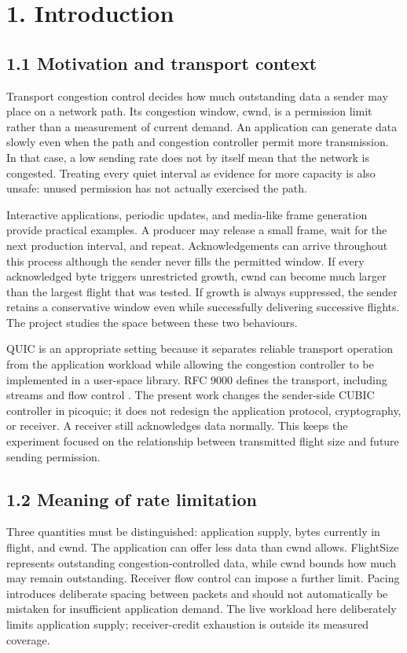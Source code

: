 \clearpage
\section*{1. Introduction}
\label{sec:introduction}
\subsection*{1.1 Motivation and transport context}

Transport congestion control decides how much outstanding data a sender may place on a network path. Its congestion window, cwnd, is a permission limit rather than a measurement of current demand. An application can generate data slowly even when the path and congestion controller permit more transmission. In that case, a low sending rate does not by itself mean that the network is congested. Treating every quiet interval as evidence for more capacity is also unsafe: unused permission has not actually exercised the path.


Interactive applications, periodic updates, and media-like frame generation provide practical examples. A producer may release a small frame, wait for the next production interval, and repeat. Acknowledgements can arrive throughout this process although the sender never fills the permitted window. If every acknowledged byte triggers unrestricted growth, cwnd can become much larger than the largest flight that was tested. If growth is always suppressed, the sender retains a conservative window even while successfully delivering successive flights. The project studies the space between these two behaviours.


QUIC is an appropriate setting because it separates reliable transport operation from the application workload while allowing the congestion controller to be implemented in a user-space library. RFC 9000 defines the transport, including streams and flow control \cite{ref4}. The present work changes the sender-side CUBIC controller in picoquic; it does not redesign the application protocol, cryptography, or receiver. A receiver still acknowledges data normally. This keeps the experiment focused on the relationship between transmitted flight size and future sending permission.


\subsection*{1.2 Meaning of rate limitation}

Three quantities must be distinguished: application supply, bytes currently in flight, and cwnd. The application can offer less data than cwnd allows. FlightSize represents outstanding congestion-controlled data, while cwnd bounds how much may remain outstanding. Receiver flow control can impose a further limit. Pacing introduces deliberate spacing between packets and should not automatically be mistaken for insufficient application demand. The live workload here deliberately limits application supply; receiver-credit exhaustion is outside its measured coverage.


